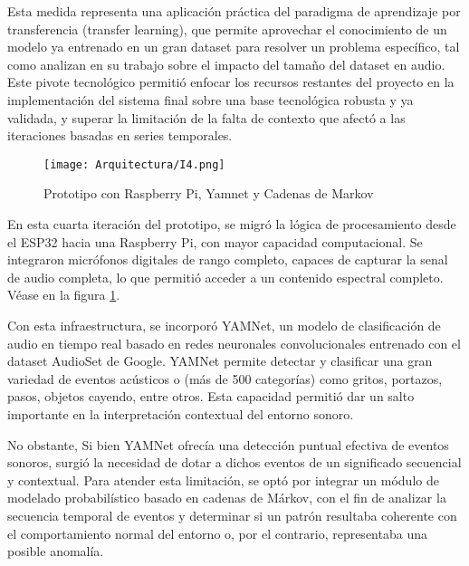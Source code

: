 Esta medida representa una aplicación práctica del paradigma de aprendizaje por transferencia (transfer learning), que permite aprovechar el conocimiento de un modelo ya entrenado en un gran dataset para resolver un problema específico, tal como analizan \citeauthor{pons2019deep} \citeyear{pons2019deep} en su trabajo sobre el impacto del tamaño del dataset en audio. Este pivote tecnológico permitió enfocar los recursos restantes del proyecto en la implementación del sistema final sobre una base tecnológica robusta y ya validada, y superar la limitación de la falta de contexto que afectó a las iteraciones basadas en series temporales.


      \begin{figure}[ht!]
            \centering
            \texttt{[image: Arquitectura/I4.png]}
            \caption{Prototipo con Raspberry Pi, Yamnet y Cadenas de Markov}
            \label{fig:prototipo4}
      \end{figure}

      En esta cuarta iteración del prototipo, se migró la lógica de procesamiento desde el ESP32 hacia una Raspberry Pi, con mayor capacidad computacional. Se integraron micrófonos digitales de rango completo, capaces de capturar la senal de audio completa, lo que permitió acceder a un contenido espectral  completo. Véase en la figura \ref{fig:prototipo4}.

      Con esta infraestructura, se incorporó YAMNet, un modelo de clasificación de audio en tiempo real basado en redes neuronales convolucionales entrenado con el dataset AudioSet de Google. YAMNet permite detectar y clasificar una gran variedad de eventos acústicos o (más de 500 categorías) como gritos, portazos, pasos, objetos cayendo, entre otros. Esta capacidad permitió dar un salto importante en la interpretación contextual del entorno sonoro.

      No obstante, Si bien YAMNet ofrecía una detección puntual efectiva de eventos sonoros, surgió la necesidad de dotar a dichos eventos de un significado secuencial y contextual. Para atender esta limitación, se optó por integrar un módulo de modelado probabilístico basado en cadenas de Márkov, con el fin de analizar la secuencia temporal de eventos y determinar si un patrón resultaba coherente con el comportamiento normal del entorno o, por el contrario, representaba una posible anomalía.


